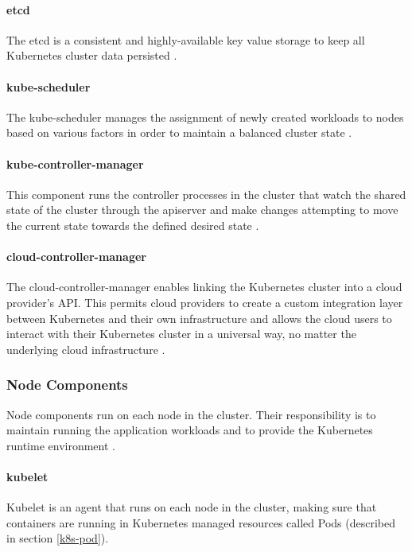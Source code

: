 \paragraph{etcd} The etcd is a consistent and highly-available key value storage to keep all Kubernetes cluster data persisted \cite{KubernetesArchitecture}.

\paragraph{kube-scheduler} The kube-scheduler manages the assignment of newly created workloads to nodes based on various factors in order to maintain a balanced cluster state \cite{KubernetesArchitecture}.

\paragraph{kube-controller-manager} This component runs the controller processes in the cluster that watch the shared state of the cluster through the apiserver and make changes attempting to move the current state towards the defined desired state \cite{KubernetesArchitecture}.

\paragraph{cloud-controller-manager} The cloud-controller-manager enables linking the Kubernetes cluster into a cloud provider's API. This permits cloud providers to create a custom integration layer between Kubernetes and their own infrastructure and allows the cloud users to interact with their Kubernetes cluster in a universal way, no matter the underlying cloud infrastructure \cite{KubernetesArchitecture}.

\subsubsection{Node Components}

Node components run on each node in the cluster. Their responsibility is to maintain running the application workloads and to provide the Kubernetes runtime environment \cite{KubernetesArchitecture}.

\paragraph{kubelet} Kubelet is an agent that runs on each node in the cluster, making sure that containers are running in Kubernetes managed resources called Pods (described in section \ref{k8s-pod}).

